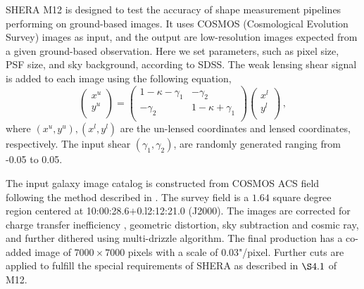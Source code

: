 \documentclass[apj]{emulateapj}
\begin{document}
SHERA M12 is designed to test the accuracy of shape
measurement pipelines performing on ground-based images. It uses COSMOS
(Cosmological Evolution Survey) images as input, and the output
are low-resolution images expected from a given ground-based 
observation. Here we set parameters, such as pixel size, PSF size, 
and sky background, according to SDSS.  
The weak lensing shear signal is added to each image using the
following equation,
\begin{equation}
\left(
      \begin{array}{c}
               x^u\\
               y^u\\
       \end{array}
\right)=
\left(
      \begin{array}{cc}
               1-\kappa-\gamma_1 & -\gamma_2\\
               -\gamma_2 & 1-\kappa+\gamma_1\\
      \end{array}
\right)
\left(
\begin{array}{c}
               x^l\\
               y^l\\
       \end{array}
\right)\,,
\end{equation}
where $(x^u,y^u), (x^l,y^l)$ are the un-lensed coordinates and lensed
coordinates, respectively. The input shear $(\gamma_1, \gamma_2)$, 
are randomly generated ranging from -0.05 to 0.05.    

The input galaxy image catalog is constructed from COSMOS ACS 
field \citep{Koekemoer2007,Scoville2007a, Scoville2007b} following
the method described in \citet{Leauthaud2007}. The survey field is 
a $1.64$ square degree region centered at 
10:00:28.6$+$0.l2:12:21.0 (J2000).  The images are corrected 
for charge transfer inefficiency \citep[CTI]{Massey2010}, geometric 
distortion, sky subtraction and cosmic ray, and further dithered using 
multi-drizzle algorithm.  The final production has a co-added image of 
$7000\times 7000$ pixels with a scale of 0.03"/pixel.  Further cuts are 
applied to fulfill the special requirements of SHERA  as described in 
$\S 4.1$ of M12. 
\end{document}
